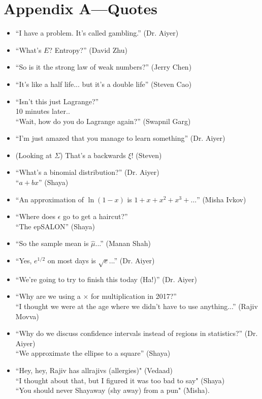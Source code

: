 \documentclass[11pt]{article}
\theoremstyle{definition}
\begin{document}
\section*{Appendix A---Quotes}
\begin{itemize}
\item ``I have a problem. It's called gambling.'' (Dr. Aiyer)
\item ``What's $E$? Entropy?'' (David Zhu)
\item ``So is it the strong law of weak numbers?'' (Jerry Chen)
\item ``It's like a half life... but it's a double life'' (Steven Cao)
\item ``Isn't this just Lagrange?''  \\ 10 minutes later.. \\ ``Wait, how do you do Lagrange again?'' (Swapnil Garg)
\item ``I'm just amazed that you manage to learn something'' (Dr. Aiyer)
\item (Looking at $\Sigma$) That's a backwards $\xi$! (Steven)
\item ``What's a binomial distribution?'' (Dr. Aiyer) \\ ``$a + bx$'' (Shaya)
\item ``An approximation of $\ln(1-x)$ is $1 + x + x^2 + x^3 + \dots$'' (Misha Ivkov)
\item ``Where does $\epsilon$ go to get a haircut?'' \\ ``The epSALON'' (Shaya)
\item ``So the sample mean is $\hat{\mu}$...'' (Manan Shah)
\item ``Yes, $e^{1/2}$ on most days is $\sqrt{e}$...'' (Dr. Aiyer)
\item ``We're going to try to finish this today (Ha!)'' (Dr. Aiyer)
\item ``Why are we using a $\times$ for multiplication in 2017?'' \\ ``I thought we were at the age where we didn't have to use anything...'' (Rajiv Movva)
\item ``Why do we discuss confidence intervals instead of regions in statistics?'' (Dr. Aiyer) \\ ``We approximate the ellipse to a square'' (Shaya)
\item ``Hey, hey, Rajiv has allrajivs (allergies)" (Vedaad) \\ 	``I thought about that, but I figured it was too bad to say" (Shaya) \\ ``You should never Shayaway (shy away) from a pun" (Misha).

\end{itemize}
\end{document}
